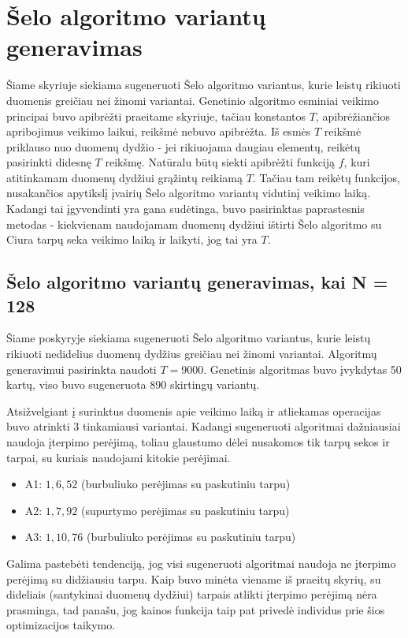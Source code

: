 \documentclass{VUMIFInfBakalaurinis}
\begin{document}
\section{Šelo algoritmo variantų generavimas}

Šiame skyriuje siekiama sugeneruoti Šelo algoritmo variantus,
kurie leistų rikiuoti duomenis greičiau nei žinomi variantai.
Genetinio algoritmo esminiai veikimo principai buvo apibrėžti praeitame skyriuje, tačiau
konstantos $T$, apibrėžiančios apribojimus veikimo laikui, reikšmė nebuvo apibrėžta.
Iš esmės $T$ reikšmė priklauso nuo duomenų dydžio - jei rikiuojama daugiau elementų, reikėtų pasirinkti didesnę $T$ reikšmę.
Natūralu būtų siekti apibrėžti funkciją $f$, kuri atitinkamam duomenų dydžiui grąžintų reikiamą $T$.
Tačiau tam reikėtų funkcijos, nusakančios apytikslį įvairių Šelo algoritmo variantų vidutinį veikimo laiką.
Kadangi tai įgyvendinti yra gana sudėtinga, buvo pasirinktas paprastesnis metodas - kiekvienam naudojamam duomenų dydžiui ištirti
Šelo algoritmo su Ciura tarpų seka veikimo laiką ir laikyti, jog tai yra $T$.

\subsection{Šelo algoritmo variantų generavimas, kai N = 128}

Šiame poskyryje siekiama sugeneruoti Šelo algoritmo variantus,
kurie leistų rikiuoti nedidelius duomenų dydžius greičiau nei žinomi variantai.
Algoritmų generavimui pasirinkta naudoti $T = 9000$.
Genetinis algoritmas buvo įvykdytas 50 kartų, viso buvo sugeneruota 890 skirtingų variantų.

Atsižvelgiant į surinktus duomenis apie veikimo laiką ir atliekamas operacijas buvo atrinkti 3 tinkamiausi variantai.
Kadangi sugeneruoti algoritmai dažniausiai naudoja įterpimo perėjimą, toliau glaustumo dėlei nusakomos tik tarpų sekos ir tarpai, su kuriais naudojami kitokie perėjimai.

\begin{itemize}
  \item A1: $1, 6, 52$ (burbuliuko perėjimas su paskutiniu tarpu)
  \item A2: $1, 7, 92$ (supurtymo perėjimas su paskutiniu tarpu)
  \item A3: $1, 10, 76 $ (burbuliuko perėjimas su paskutiniu tarpu)
\end{itemize}

Galima pastebėti tendenciją, jog visi sugeneruoti algoritmai naudoja ne įterpimo perėjimą su didžiausiu tarpu.
Kaip buvo minėta viename iš praeitų skyrių, su dideliais (santykinai duomenų dydžiui) tarpais atlikti įterpimo perėjimą nėra prasminga,
tad panašu, jog kainos funkcija taip pat privedė individus prie šios optimizacijos taikymo.
\end{document}
